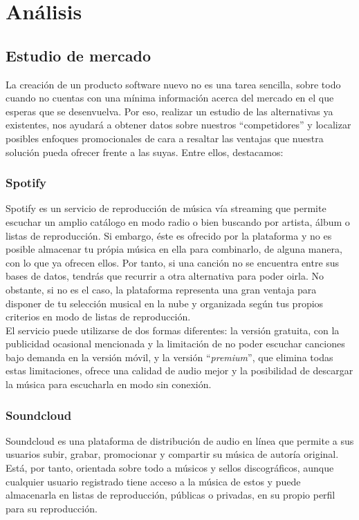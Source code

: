 \section{Análisis}
\label{sec:analisis}

\subsection{Estudio de mercado}

La creación de un producto software nuevo no es una tarea sencilla, sobre todo cuando no cuentas con una mínima información acerca del mercado en el que esperas que se desenvuelva. Por eso, realizar un estudio de las alternativas ya existentes, nos ayudará a obtener datos sobre nuestros ``competidores'' y localizar posibles enfoques promocionales de cara a resaltar las ventajas que nuestra solución pueda ofrecer frente a las suyas. Entre ellos, destacamos:

\subsubsection{Spotify \cite{Spotify}}
Spotify es un servicio de reproducción de música vía streaming que permite escuchar un amplio catálogo en modo radio o bien buscando por artista, álbum o listas de reproducción. Si embargo, éste es ofrecido por la plataforma y no es posible almacenar tu própia música en ella para combinarlo, de alguna manera, con lo que ya ofrecen ellos. Por tanto, si una canción no se encuentra entre sus bases de datos, tendrás que recurrir a otra alternativa para poder oirla. No obstante, si no es el caso, la plataforma representa una gran ventaja para disponer de tu selección musical en la nube y organizada según tus propios criterios en modo de listas de reproducción.\\

El servicio puede utilizarse de dos formas diferentes: la versión gratuita, con la publicidad ocasional mencionada y la limitación de no poder escuchar canciones bajo demanda en la versión móvil, y la versión ``\textit{premium}'', que elimina todas estas limitaciones, ofrece una calidad de audio mejor y la posibilidad de descargar la música para escucharla en modo sin conexión.

\subsubsection{Soundcloud \cite{Soundcloud}}
Soundcloud es una plataforma de distribución de audio en línea que permite a sus usuarios subir, grabar, promocionar y compartir su música de autoría original. Está, por tanto, orientada sobre todo a músicos y sellos discográficos, aunque cualquier usuario registrado tiene acceso a la música de estos y puede almacenarla en listas de reproducción, públicas o privadas, en su propio perfil para su reproducción.\\

